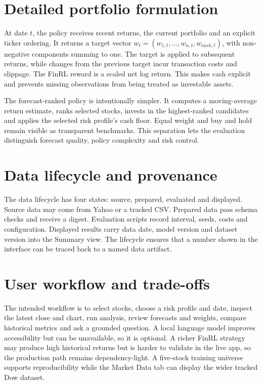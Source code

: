 \section{Detailed portfolio formulation}
At date $t$, the policy receives recent returns, the current portfolio and an explicit ticker ordering. It returns a target vector $w_t=(w_{1,t},\ldots,w_{n,t},w_{cash,t})$, with non-negative components summing to one. The target is applied to subsequent returns, while changes from the previous target incur transaction costs and slippage. The FinRL reward is a scaled net log return. This makes cash explicit and prevents missing observations from being treated as investable assets.

The forecast-ranked policy is intentionally simpler. It computes a moving-average return estimate, ranks selected stocks, invests in the highest-ranked candidates and applies the selected risk profile's cash floor. Equal weight and buy and hold remain visible as transparent benchmarks. This separation lets the evaluation distinguish forecast quality, policy complexity and risk control.

\section{Data lifecycle and provenance}
The data lifecycle has four states: source, prepared, evaluated and displayed. Source data may come from Yahoo or a tracked CSV. Prepared data pass schema checks and receive a digest. Evaluation scripts record interval, seeds, costs and configuration. Displayed results carry data date, model version and dataset version into the Summary view. The lifecycle ensures that a number shown in the interface can be traced back to a named data artifact.

\section{User workflow and trade-offs}
The intended workflow is to select stocks, choose a risk profile and date, inspect the latest close and chart, run analysis, review forecasts and weights, compare historical metrics and ask a grounded question. A local language model improves accessibility but can be unavailable, so it is optional. A richer FinRL strategy may produce high historical returns but is harder to validate in the live app, so the production path remains dependency-light. A five-stock training universe supports reproducibility while the Market Data tab can display the wider tracked Dow dataset.
